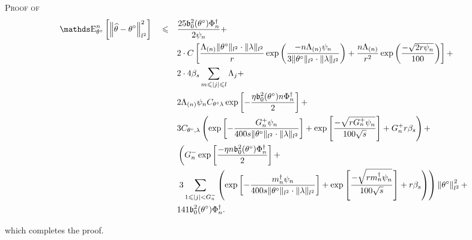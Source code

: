 \begin{pro}{\textsc{Proof of } \\}
\begin{alignat*}{3}
& \E_{\theta^{\circ}}^{n}\left[\left\Vert \widehat{\theta} - \theta^{\circ}\right\Vert_{l^{2}}^{2}\right] && \leq &&  \frac{25 \mathfrak{b}_{0}^{2}(\theta^{\circ}) \Phi^{\dagger}_{n}}{2 \psi_{n}} + \notag\\
& && && 2 \cdot C \left[\frac{\Lambda_{(n)} \Vert \theta^{\circ} \Vert_{l^{2}} \cdot \Vert \lambda \Vert_{l^{2}}}{r} \exp\left(\frac{-n \Lambda_{(n)} \psi_{n}}{3 \Vert \theta^{\circ} \Vert_{l^{2}} \cdot \Vert \lambda \Vert_{l^{2}}}\right) + \frac{n \Lambda_{(n)}}{r^{2}} \exp\left(\frac{- \sqrt{2 r \psi_{n}}}{100}\right)\right] +\notag\\
& && && 2 \cdot 4 \beta_{s} \sum\limits_{m \leq \vert j \vert \leq l} \Lambda_{j}+\notag\\
& && && 2 \Lambda_{(n)} \psi_{n} C_{\theta^{\circ} \lambda} \exp \left[-\frac{\eta \mathfrak{b}_{0}^{2}(\theta^{\circ}) n \Phi^{\dagger}_{n}}{2}\right] +\notag\\
& && && 3 C_{\theta^{\circ}, \lambda} \left(\exp\left[- \frac{G^{+}_{n} \psi_{n}}{400 s \Vert \theta^{\circ} \Vert_{l^{2}} \cdot \Vert \lambda \Vert_{l^{2}}}\right] + \exp\left[ \frac{- \sqrt{r G^{+}_{n} \psi_{n}}}{100 \sqrt{s}}\right] + G^{+}_{n} r\beta_{s}\right) +\\
& && && \left(G^{-}_{n}\exp\left[\frac{- \eta n \mathfrak{b}_{0}^{2}(\theta^{\circ}) \Phi^{\dagger}_{n}}{2}\right] + \right.\notag\\
& && &&\left. 3 \sum\limits_{1 \leq \vert j \vert < G^{-}_{n}}\left(\exp\left[- \frac{m^{\dagger}_{n} \psi_{n}}{400 s \Vert \theta^{\circ} \Vert_{l^{2}} \cdot \Vert \lambda \Vert_{l^{2}}}\right] + \exp\left[ \frac{- \sqrt{r m^{\dagger}_{n} \psi_{n}}}{100\sqrt{s}}\right] + r\beta_{s}\right)\right) \left\Vert \theta^{\circ} \right\Vert_{l^{2}}^{2} +\\
& && && 141 \mathfrak{b}_{0}^{2}(\theta^{\circ}) \Phi^{\dagger}_{n}.
\end{alignat*}

which completes the proof.

\qedsymbol
\end{pro}


